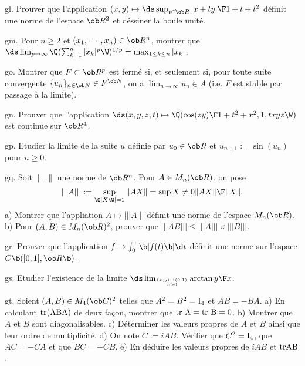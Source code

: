 \exo [Level=2,Fight=1,Learn=1,Type=\Exercices,Field=\Normes,Origin=] gl. 
Prouver que l'application $(x,y)\mapsto\ds\sup_{t\in\ob R}{|x+ty|\F1+t+t^2}$ 
définit une norme de l'espace $\ob R^2$ et déssiner la boule unité. 

\exo [Level=1,Fight=2,Learn=1,Type=\Exercices,Field=\Suites,Origin=] gm. 
Pour $n\ge2$ et $(x_1,\cdots, x_n)\in\ob R^n$, montrer que 
$\ds \lim_{p\to\infty}\Q(\sum_{k=1}^n|x_k|^p\W)^{1/p}=\max_{1\le k\le n}|x_k|$.

\exo [Level=2,Fight=2,Learn=2,Type=\Cours,Field=\Topologie,Origin=] go. Montrer que $F\subset \ob R^p$ est fermé si, 
et seulement si, pour toute suite convergente $\{u_n\}_{n\in\ob N}\in F^{\ob N}$, on a $\lim_{n\to\infty}u_n\in A$ 
(i.e. $F$ est stable par passage à la limite). %

\exo [Level=2,Fight=0,Learn=0,Type=\TravauxDirigés,Field=\Continuité,Origin=] gn. 
Prouver que 
l'application $\ds(x,y,z,t)\mapsto \Q({\cos (zy)\F1+t^2+x^2},1,txyz\W)$ 
est continue sur $\ob R^4$. 

\exo [Level=1,Fight=2,Learn=2,Type=\Exercices,Field=\Suites,Origin=] gp. 
Etudier la limite de la suite $u$ définie par $u_0\in\ob R$ et $u_{n+1}:=\sin(u_n)$ pour $n\ge0$.  

\exo [Level=2,Fight=2,Learn=2,Type=\Cours,Field=\Normes,Origin=\MP] gq. 
Soit $\|.\|$ une norme de $\ob R^n$. Pour $A\in\sc M_n(\ob R)$, 
on pose $$
|||A|||:=\sup_{\Q|X\W|=1}\|AX\|=\sup{X\neq0}{\|AX\|\F \|X\|}.
$$ 
a) Montrer que l'appliation $A\mapsto|||A|||$ définit 
une norme de l'espace $\sc M_n(\ob R)$. \pn
b) Pour $(A,B)\in\sc M_n(\ob R)^2$, prouver que $|||AB|||\le |||A|||\times|||B|||$. %

\exo [Level=2,Fight=1,Learn=1,Type=\Cours,Field=\Normes,Origin=] gr. 
Prouver que l'application $f\mapsto\int_0^1\b|f(t)\b|\d t$ définit une norme sur l'espace $\sc C\b([0,1],\ob R\b)$. 

\exo [Level=2,Fight=0,Learn=0,Type=\Exercices,Field=\Continuité,Origin=] gs. 
Etudier l'existence de la limite $\ds \lim_{(x,y)\to(0,1)\atop x>0}\arctan{y\F x}$. 

\exo [Level=2,Fight=1,Learn=1,Type=\Colles,Field=\Diagonalisation,Origin=] gt. 
Soient $(A,B)\in\sc M_4(\ob C)^2$ telles que $A^2=B^2=\rm I_4$ et $AB=-BA$. \pn
a) En calculant $\rm{tr}(ABA)$ de deux fa\c con, montrer que $\rm{tr}\ A=\rm{tr}\ B=0$. \pn
b) Montrer que $A$ et $B$ sont diagonalisables. \pn
c) Déterminer les valeurs propres de $A$ et $B$ ainsi que leur ordre de multiplicité. \pn
d) On note $C:=iAB$. Vérifier que $C^2=\rm I_4$, que $AC=-CA$ et que $BC=-CB$. \pn
e) En déduire les valeurs propres de $iAB$ et $\rm{tr }AB$. 

